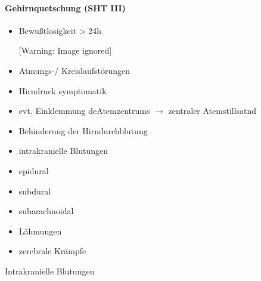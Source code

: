 \documentclass{article}
\begin{document}
\paragraph[Gehirnquetschung (SHT III{\textdegree})]{Gehirnquetschung
(SHT III{\textdegree})}
\begin{itemize}
\item Bewu{\ss}tlosigkeit  {\textgreater}  24h

\begin{center}
 [Warning: Image ignored] %

\end{center}
\item Atmungs-/ Kreislaufst\"orungen

\item Hirndruck symptomatik

\item evt. Einklemmung deAtemzentrums ${\rightarrow}$ zentraler
Atemstillsatnd

\item Behinderung der Hirndurchblutung

\item intrakranielle Blutungen

\end{itemize}
\begin{itemize}
\item epidural

\item subdural

\item subarachnoidal

\end{itemize}
\begin{itemize}
\item L\"ahmungen

\item zerebrale Kr\"ampfe

\end{itemize}
Intrakranielle Blutungen
\end{document}
